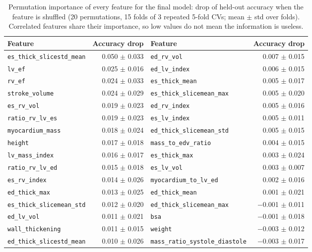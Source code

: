 \begin{table}[H]
\centering
\scriptsize
\setlength{\tabcolsep}{4pt}
\begin{adjustbox}{max width=\linewidth}
\begin{tabular}{lrlr}
\toprule
Feature & Accuracy drop & Feature & Accuracy drop \\
\midrule
\texttt{es\_thick\_slicestd\_mean} & 0.050 $\pm$ 0.033 & \texttt{ed\_rv\_vol} & 0.007 $\pm$ 0.015 \\
\texttt{lv\_ef} & 0.025 $\pm$ 0.016 & \texttt{ed\_lv\_index} & 0.006 $\pm$ 0.015 \\
\texttt{rv\_ef} & 0.024 $\pm$ 0.033 & \texttt{es\_thick\_mean} & 0.005 $\pm$ 0.017 \\
\texttt{stroke\_volume} & 0.024 $\pm$ 0.029 & \texttt{es\_thick\_slicemean\_max} & 0.005 $\pm$ 0.020 \\
\texttt{es\_rv\_vol} & 0.019 $\pm$ 0.023 & \texttt{ed\_rv\_index} & 0.005 $\pm$ 0.016 \\
\texttt{ratio\_rv\_lv\_es} & 0.019 $\pm$ 0.023 & \texttt{es\_lv\_index} & 0.005 $\pm$ 0.011 \\
\texttt{myocardium\_mass} & 0.018 $\pm$ 0.024 & \texttt{ed\_thick\_slicemean\_std} & 0.005 $\pm$ 0.015 \\
\texttt{height} & 0.017 $\pm$ 0.018 & \texttt{mass\_to\_edv\_ratio} & 0.004 $\pm$ 0.015 \\
\texttt{lv\_mass\_index} & 0.016 $\pm$ 0.017 & \texttt{es\_thick\_max} & 0.003 $\pm$ 0.024 \\
\texttt{ratio\_rv\_lv\_ed} & 0.015 $\pm$ 0.018 & \texttt{es\_lv\_vol} & 0.003 $\pm$ 0.007 \\
\texttt{es\_rv\_index} & 0.014 $\pm$ 0.026 & \texttt{myocardium\_to\_lv\_ed} & 0.002 $\pm$ 0.016 \\
\texttt{ed\_thick\_max} & 0.013 $\pm$ 0.025 & \texttt{ed\_thick\_mean} & 0.001 $\pm$ 0.021 \\
\texttt{es\_thick\_slicemean\_std} & 0.012 $\pm$ 0.020 & \texttt{ed\_thick\_slicemean\_max} & $-$0.001 $\pm$ 0.011 \\
\texttt{ed\_lv\_vol} & 0.011 $\pm$ 0.021 & \texttt{bsa} & $-$0.001 $\pm$ 0.018 \\
\texttt{wall\_thickening} & 0.011 $\pm$ 0.015 & \texttt{weight} & $-$0.003 $\pm$ 0.012 \\
\texttt{ed\_thick\_slicestd\_mean} & 0.010 $\pm$ 0.026 & \texttt{mass\_ratio\_systole\_diastole} & $-$0.003 $\pm$ 0.017 \\
\bottomrule
\end{tabular}
\end{adjustbox}
\caption{Permutation importance of every feature for the final model: drop of held-out accuracy when the feature is shuffled (20 permutations, 15 folds of 3 repeated 5-fold CVs; mean $\pm$ std over folds). Correlated features share their importance, so low values do not mean the information is useless.}
\label{tab:supp-importance}
\end{table}
